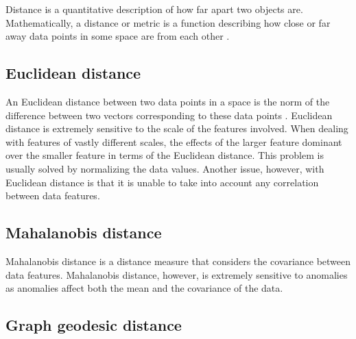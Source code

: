 Distance is a quantitative description of how far apart two objects are.
Mathematically, a distance or metric is a function describing how close or far
away data points in some space are from each other \cite{Khoa:2012}.

\subsection{Euclidean distance}
\label{distance:euclidian}
An Euclidean distance between two data points in a space is the norm of the
difference between two vectors corresponding to these data points
\cite{Khoa:2012}. Euclidean distance is extremely sensitive to the scale of the
features involved. When dealing with features of vastly different scales, the
effects of the larger feature dominant over the smaller feature in terms of the
Euclidean distance. This problem is usually solved by normalizing the data
values. Another issue, however, with Euclidean distance is that it is unable to
take into account any correlation between data features.

\subsection{Mahalanobis distance}
\label{distance:mahalanobis}
Mahalanobis distance is a distance measure that considers the covariance between
data features. Mahalanobis distance, however, is extremely sensitive to
anomalies as anomalies affect both the mean and the covariance of the data.

\subsection{Graph geodesic distance}
\label{distance:graphGeodesic}
